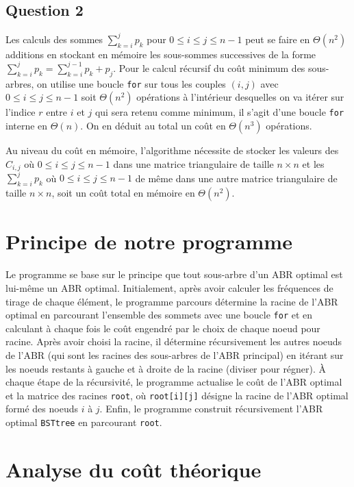 \documentclass[a4paper,10pt,french]{article}
\def\saut#1{\vspace{#1\baselineskip}}
\begin{document}
\subsection*{Question 2}

Les calculs des sommes $\sum_{k=i}^jp_k$ pour $0\leq i\leq j\leq n-1$ peut se faire en $\Theta(n^2)$ additions en stockant en mémoire les sous-sommes successives de la forme $\sum_{k=i}^jp_k=\sum_{k=i}^{j-1}p_k+p_j$.
Pour le calcul récursif du coût minimum des sous-arbres, on utilise une boucle \texttt{for} sur tous les couples $(i,j)$ avec $0\leq i\leq j\leq n-1$ soit $\Theta(n^2)$ opérations à l'intérieur desquelles on va itérer sur l'indice $r$ entre $i$ et $j$ qui sera retenu comme minimum, il s'agit d'une boucle \texttt{for} interne en $\Theta(n)$.
On en déduit au total un coût en $\Theta(n^3)$ opérations.

\saut{1}

Au niveau du coût en mémoire, l'algorithme nécessite de stocker les valeurs des $C_{i,j}$ où $0\leq i\leq j\leq n-1$ dans une matrice triangulaire de taille $n\times n$ et les $\sum_{k=i}^jp_k$ où $0\leq i\leq j\leq n-1$ de même dans une autre matrice triangulaire de taille $n\times n$, soit un coût total en mémoire en $\Theta(n^2)$.

\section{Principe de notre programme}
Le programme se base sur le principe que tout sous-arbre d'un ABR optimal est lui-même un ABR optimal.
Initialement, après avoir calculer les fréquences de tirage de chaque élément, le programme parcours détermine la racine de l'ABR optimal en parcourant l'ensemble des sommets avec une boucle \texttt{for} et en calculant à chaque fois le coût engendré par le choix de chaque noeud pour racine.
Après avoir choisi la racine, il détermine récursivement les autres noeuds de l'ABR (qui sont
les racines des sous-arbres de l'ABR principal) en itérant sur les noeuds restants à gauche et à droite de la racine (diviser pour régner).
À chaque étape de la récursivité, le programme actualise le coût de l'ABR optimal et la matrice des racines \texttt{root}, où \texttt{root[i][j]} désigne la racine de l'ABR optimal formé des noeuds $i$ à $j$.
Enfin, le programme construit récursivement l'ABR optimal \texttt{BSTtree} en parcourant \texttt{root}.

\section{Analyse du coût théorique}
\end{document}
